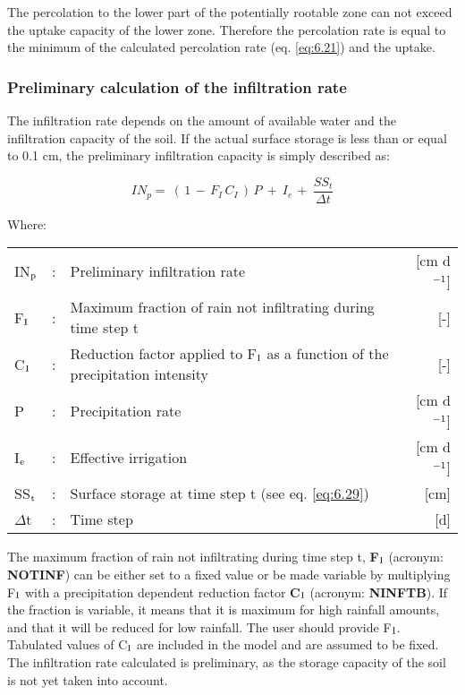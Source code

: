 The percolation to the lower part of the potentially rootable zone can not exceed the
uptake capacity of the lower zone. Therefore the percolation rate is equal to the minimum
of the calculated percolation rate (eq. \ref{eq:6.21}) and the uptake.

\subsubsection{Preliminary calculation of the infiltration rate}
The infiltration rate depends on the amount of available water and the infiltration capacity
of the soil. If the actual surface storage is less than or equal to 0.1 cm, the preliminary
infiltration capacity is simply described as:

\begin{equation}
\label{eq:6.26}
IN_{p} =~ (\, 1\, -\, F _{I} \, C _{I} \, )\, P~+~ I _{e~} +~ \frac{SS_{t}}{ \Delta t} 
\end{equation}

Where:\\[5pt]
\begin{tabularx}{\textwidth}{llXr}
	IN$_{{\rm p}}$ &:& Preliminary infiltration rate  & [cm d$^{{\rm -1}}$]\\
	F$_{{\rm I}}$ &:& Maximum fraction of rain not infiltrating during time step t  & [-]\\
	C$_{{\rm I}}$ &:& Reduction factor applied to F$_{{\rm I}}$ as a function of the 
	precipitation intensity  & [-]\\
	P &:& Precipitation rate  & [cm d$^{{\rm -1}}$]\\
	I$_{{\rm e}}$ &:& Effective irrigation  & [cm d$^{{\rm -1}}$]\\
	SS$_{{\rm t}}$ &:& Surface storage at time step t (see eq. \ref{eq:6.29})  & [cm]\\
	$\Delta$t &:& Time step  & [d]\\
\end{tabularx}

The maximum fraction of rain not infiltrating during time step t, {\bf F$_{{\rm I}}$} 
(acronym: {\bf NOTINF})
can be either set to a fixed value or be made variable by multiplying F$_{{\rm I}}$ 
with a precipitation dependent reduction factor {\bf C$_{{\rm I}}$} (acronym: {\bf NINFTB}). 
If the fraction is variable, it means that it is maximum for high rainfall amounts, and 
that it will be reduced for low rainfall. The user should provide F$_{{\rm I}}$. 
Tabulated values of C$_{{\rm I}}$ are included in the model and
are assumed to be fixed. The infiltration rate calculated is preliminary, as the storage
capacity of the soil is not yet taken into account. 


